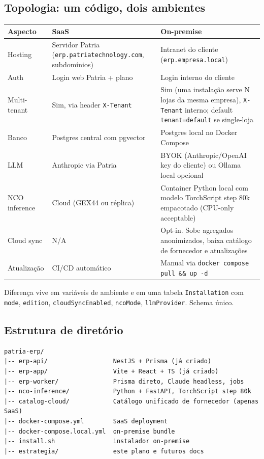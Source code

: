 \documentclass[11pt,a4paper]{article}
\begin{document}
\subsection{Topologia: um código, dois ambientes}

\begin{longtable}{@{}p{2.5cm}p{5.5cm}p{6.5cm}@{}}
\toprule
\textbf{Aspecto} & \textbf{SaaS} & \textbf{On-premise} \\
\midrule
\endhead
Hosting & Servidor Patria
(\texttt{erp.patriatechnology.com}, subdomínios) & Intranet do cliente
(\texttt{erp.empresa.local}) \\
Auth & Login web Patria + plano & Login interno do cliente \\
Multi-tenant & Sim, via header \texttt{X-Tenant} & Sim (uma instalação
serve N lojas da mesma empresa), \texttt{X-Tenant} interno; default
\texttt{tenant=default} se single-loja \\
Banco & Postgres central com pgvector & Postgres local no Docker Compose \\
LLM & Anthropic via Patria & BYOK (Anthropic/OpenAI key do cliente) ou Ollama
local opcional \\
NCO inference & Cloud (GEX44 ou réplica) & Container Python local com modelo
TorchScript step 80k empacotado (CPU-only acceptable) \\
Cloud sync & N/A & Opt-in. Sobe agregados anonimizados, baixa catálogo de
fornecedor e atualizações \\
Atualização & CI/CD automático & Manual via
\texttt{docker compose pull \&\& up -d} \\
\bottomrule
\end{longtable}

Diferença vive em variáveis de ambiente e em uma tabela \texttt{Installation}
com \texttt{mode}, \texttt{edition}, \texttt{cloudSyncEnabled}, \texttt{ncoMode},
\texttt{llmProvider}. Schema único.

\subsection{Estrutura de diretório}

\begin{lstlisting}
patria-erp/
|-- erp-api/                  NestJS + Prisma (já criado)
|-- erp-app/                  Vite + React + TS (já criado)
|-- erp-worker/               Prisma direto, Claude headless, jobs
|-- nco-inference/            Python + FastAPI, TorchScript step 80k
|-- catalog-cloud/            Catálogo unificado de fornecedor (apenas SaaS)
|-- docker-compose.yml        SaaS deployment
|-- docker-compose.local.yml  on-premise bundle
|-- install.sh                instalador on-premise
|-- estrategia/               este plano e futuros docs
\end{lstlisting}
\end{document}
